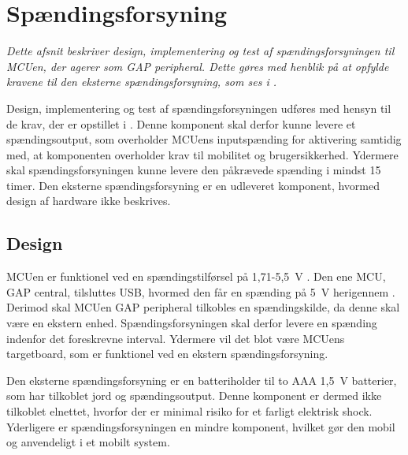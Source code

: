 \section{Spændingsforsyning}\label{spaendingsforsyning}
\textit{Dette afsnit beskriver design, implementering og test af spændingsforsyningen til MCUen, der agerer som GAP peripheral. Dette gøres med henblik på at opfylde kravene til den eksterne spændingsforsyning, som ses i .}

Design, implementering og test af spændingsforsyningen udføres med hensyn til de krav, der er opstillet i . \newline
Denne komponent skal derfor kunne levere et spændingsoutput, som overholder MCUens inputspænding for aktivering samtidig med, at komponenten overholder krav til mobilitet og brugersikkerhed. Ydermere skal spændingsforsyningen kunne levere den påkrævede spænding i mindst 15 timer. \newline
Den eksterne spændingsforsyning er en udleveret komponent, hvormed design af hardware ikke beskrives. 

\subsection{Design}
MCUen er funktionel ved en spændingstilførsel på 1,71-5,5~V \citep{Semiconductor20164200M,Semiconductor2016PRoC}. Den ene MCU, GAP central, tilsluttes USB, hvormed den får en spænding på 5~V herigennem \citep{Semiconductor2016}. Derimod skal MCUen GAP peripheral tilkobles en spændingskilde, da denne skal være en ekstern enhed. Spændingsforsyningen skal derfor levere en spænding indenfor det foreskrevne interval. Ydermere vil det blot være MCUens targetboard, som er funktionel ved en ekstern spændingsforsyning.

Den eksterne spændingsforsyning er en batteriholder til to AAA 1,5~V batterier, som har tilkoblet jord og spændingsoutput. Denne komponent er dermed ikke tilkoblet elnettet, hvorfor der er minimal risiko for et farligt elektrisk shock. Yderligere er spændingsforsyningen en mindre komponent, hvilket gør den mobil og anvendeligt i et mobilt system.

